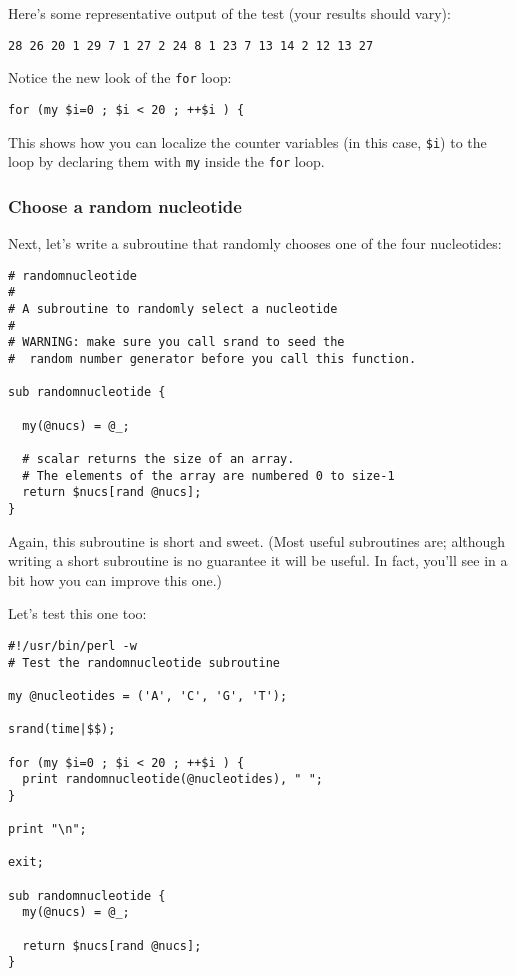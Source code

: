 Here's some representative output of the test (your results should vary):

\begin{lstlisting}
28 26 20 1 29 7 1 27 2 24 8 1 23 7 13 14 2 12 13 27 
\end{lstlisting}

Notice the new look of the \verb|for| loop:

\begin{lstlisting}
for (my $i=0 ; $i < 20 ; ++$i ) {
\end{lstlisting}

This shows how you can localize the counter variables (in this case, \verb|$i|) to the loop by declaring them with \verb|my| inside the \verb|for| loop.

\subsubsection{Choose a random nucleotide}
Next, let's write a subroutine that randomly chooses one of the four nucleotides: 

\begin{lstlisting}
# randomnucleotide
#
# A subroutine to randomly select a nucleotide
#
# WARNING: make sure you call srand to seed the
#  random number generator before you call this function.

sub randomnucleotide {

  my(@nucs) = @_;

  # scalar returns the size of an array. 
  # The elements of the array are numbered 0 to size-1
  return $nucs[rand @nucs];
}
\end{lstlisting}

Again, this subroutine is short and sweet. (Most useful subroutines are; although writing a short subroutine is no guarantee it will be useful.  In fact, you'll see in a bit how you can improve this one.)

Let's test this one too:

\begin{lstlisting}
#!/usr/bin/perl -w
# Test the randomnucleotide subroutine

my @nucleotides = ('A', 'C', 'G', 'T');

srand(time|$$);

for (my $i=0 ; $i < 20 ; ++$i ) {
  print randomnucleotide(@nucleotides), " ";
}

print "\n";

exit;

sub randomnucleotide {
  my(@nucs) = @_;

  return $nucs[rand @nucs];
}
\end{lstlisting}

